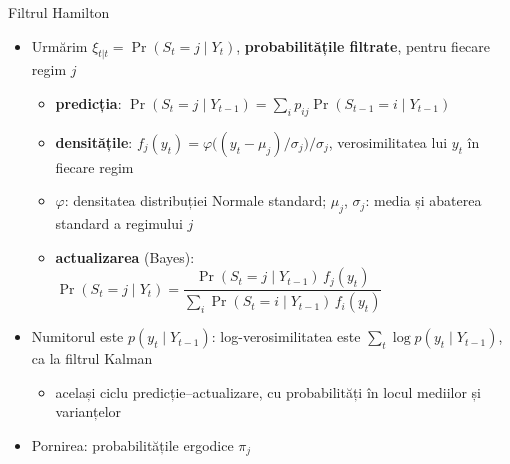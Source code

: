 \begin{frame}{Filtrul Hamilton}
\itemsize{\small}
\begin{itemize}
    \item Urmărim $\xi_{t|t} = \Pr(S_t = j \mid Y_t)$, \textbf{probabilitățile filtrate}, pentru fiecare regim $j$
    \begin{itemize}
        \item \textbf{predicția}: $\Pr(S_t = j \mid Y_{t-1}) = \sum_i p_{ij}\Pr(S_{t-1} = i \mid Y_{t-1})$
        \item \textbf{densitățile}: $f_j(y_t) = \varphi\bigl((y_t - \mu_j)/\sigma_j\bigr)/\sigma_j$, verosimilitatea lui $y_t$ în fiecare regim
        \item $\varphi$: densitatea distribuției Normale standard; $\mu_j$, $\sigma_j$: media și abaterea standard a regimului $j$
        \item \textbf{actualizarea} (Bayes): $\Pr(S_t = j \mid Y_t) = \dfrac{\Pr(S_t = j \mid Y_{t-1})\,f_j(y_t)}{\sum_i\Pr(S_t = i \mid Y_{t-1})\,f_i(y_t)}$
    \end{itemize}
    \item Numitorul este $p(y_t \mid Y_{t-1})$: log-verosimilitatea este $\sum_t\log p(y_t \mid Y_{t-1})$, ca la filtrul Kalman
    \begin{itemize}
        \item același ciclu predicție--actualizare, cu probabilități în locul mediilor și varianțelor
    \end{itemize}
    \item Pornirea: probabilitățile ergodice $\pi_j$
\end{itemize}
\end{frame}

